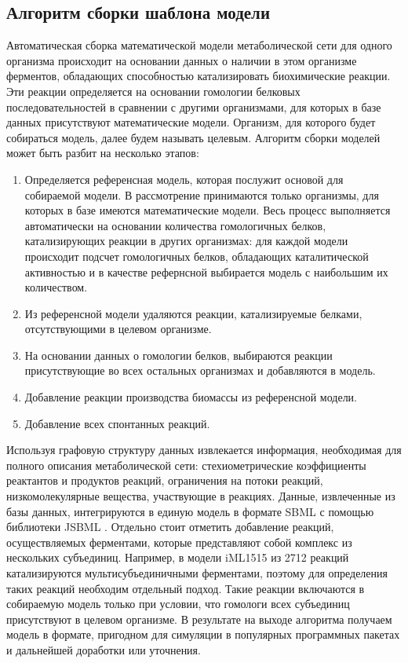 \subsection{Алгоритм сборки шаблона модели}

Автоматическая сборка математической модели метаболической сети для одного организма происходит на основании данных о наличии в этом организме ферментов, обладающих способностью катализировать биохимические реакции. Эти реакции определяется на основании гомологии белковых последовательностей в сравнении с другими организмами, для которых в базе данных присутствуют математические модели. Организм, для которого будет собираться модель, далее будем называть целевым.
Алгоритм сборки моделей может быть разбит на несколько этапов:
  \begin{enumerate}
    \item Определяется референсная модель, которая послужит основой для собираемой модели. В рассмотрение принимаются только организмы, для которых в базе имеются математические модели. Весь процесс выполняется автоматически на основании количества гомологичных белков, катализирующих реакции в других организмах: для каждой модели происходит подсчет гомологичных белков, обладающих каталитической активностью и в качестве рефернсной выбирается модель с наибольшим их  количеством.
    \item Из референсной модели удаляются реакции, катализируемые белками, отсутствующими в целевом организме. 
    \item На основании данных о гомологии белков, выбираются реакции присутствующие во всех остальных организмах и добавляются в модель.
    \item Добавление реакции производства биомассы из референсной модели.
    \item Добавление всех спонтанных реакций.
  \end{enumerate}

Используя графовую структуру данных извлекается информация, необходимая для полного описания метаболической сети: стехиометрические коэффициенты реактантов и продуктов реакций, ограничения на потоки реакций, низкомолекулярные вещества, участвующие в реакциях.
Данные, извлеченные из базы данных, интегрируются в единую модель в формате SBML с помощью библиотеки JSBML . 
Отдельно стоит отметить добавление реакций, осуществляемых ферментами, которые представляют собой комплекс из нескольких субъединиц. Например, в модели iML1515 из 2712 реакций  катализируются мультисубъединичными ферментами, поэтому для определения таких реакций необходим отдельный подход. Такие реакции включаются в собираемую модель только при условии, что гомологи всех субъединиц присутствуют в целевом организме. 
В результате на выходе алгоритма получаем модель в формате, пригодном для симуляции в популярных программных пакетах и дальнейшей доработки или уточнения.


